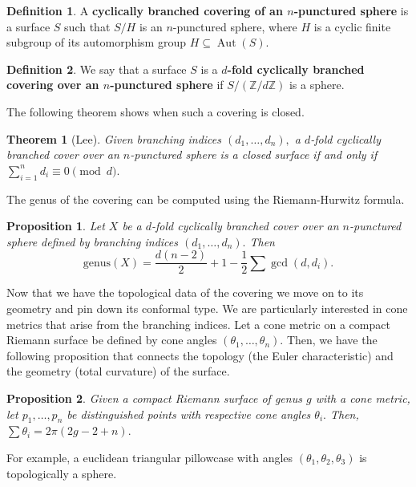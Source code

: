 \documentclass[12pt,reqno]{amsart}
\DeclareMathOperator{\Aut}{Aut}
\newtheorem*{thm*}{Theorem}
\newtheorem*{proposition}{Proposition}
\theoremstyle{definition}
\newtheorem{defn}{Definition}
\theoremstyle{remark}
\begin{document}


\begin{defn} A \textbf{cyclically branched covering of an $n$-punctured sphere} is a surface $S$ such that $S/H$ is an $n$-punctured sphere, where $H$ is a cyclic finite subgroup of its automorphism group $H \subseteq \Aut(S)$.   \end{defn}



\begin{defn} We say that a surface $S$ is a \textbf{$d$-fold cyclically branched covering over an $n$-punctured sphere} if $S/(\mathbb{Z}/ d \mathbb{Z})$ is a sphere.  \end{defn}


The following theorem shows when such a covering is closed. 

\begin{thm*} [Lee] Given branching indices $(d_1, \ldots , d_n),$ a $d$-fold cyclically branched cover over an $n$-punctured sphere is a closed surface if and only if $\sum\limits_{i=1}^n d_i \equiv 0 \pmod d.$ 
\end{thm*}


The genus of the covering can be computed using the Riemann-Hurwitz formula.

\begin{proposition}
Let $X$ be a $d$-fold cyclically branched cover over an $n$-punctured sphere defined by branching indices $(d_1, \ldots , d_n).$ Then $$\textrm{genus}(X) = \frac{d (n - 2)}{2} + 1 - \frac{1}{2} \sum \gcd(d, d_i).$$ 
\end{proposition}

Now that we have the topological data of the covering we move on to its geometry and pin down its conformal type. We are particularly interested in cone metrics that arise from the branching indices. Let a cone metric on a compact Riemann surface be defined by cone angles $(\theta_1, \ldots , \theta_n).$ Then, we have the following proposition that connects the topology (the Euler characteristic) and the geometry (total curvature) of the surface. 

\begin{proposition}
Given a compact Riemann surface of genus $g$ with a cone metric, let $p_1, \ldots , p_n$ be distinguished points with respective cone angles $\theta_i.$ Then, $\sum \theta_i = 2 \pi (2 g - 2 + n).$
\end{proposition}

For example, a euclidean triangular pillowcase with angles $(\theta_1, \theta_2, \theta_3)$ is topologically a sphere. 
\end{document}
